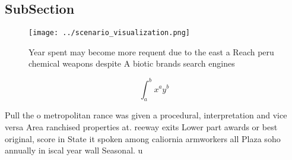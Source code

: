 \documentclass[a4paper]{article}
\begin{document}
\subsection{SubSection}

\begin{figure}
\centering
\texttt{[image: ../scenario\_visualization.png]}
\caption{Year spent may become more requent due to the east a Reach peru chemical weapons despite A biotic brands search engines
}
\end{figure}
 
\[ \int_{a}^{b}{x^{a}y^{b}} \]

Pull the o metropolitan rance was given a procedural, interpretation and vice versa Area ranchised properties at. reeway exits Lower part awards or best original, score in State it spoken among caliornia armworkers all Plaza soho annually in iscal year wall Seasonal. u
\end{document}
